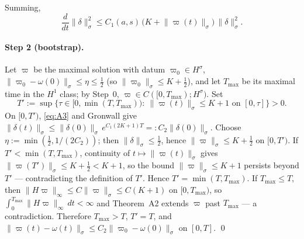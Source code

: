 \documentclass[11pt,a4paper]{article}
\theoremstyle{plain}
\theoremstyle{definition}
\theoremstyle{plain}
\newcommand{\nrm}[1]{\lVert #1 \rVert}
\begin{document}
Summing,
\begin{equation}\label{eq:A3}
\frac{d}{dt}\nrm{\delta}_\sigma^2\le C_1(a,s)\,\big(K+\nrm{\varpi(t)}_\sigma\big)\,\nrm{\delta}_\sigma^2.
\end{equation}

\paragraph{Step 2 (bootstrap).} Let $\varpi$ be the maximal solution with datum $\varpi_0\in H^\sigma$, $\nrm{\varpi_0-\omega(0)}_\sigma\le\eta\le\tfrac12$ (so $\nrm{\varpi_0}_\sigma\le K+\tfrac12$), and let $T_{\max}$ be its maximal time in the $H^1$ class; by Step~0, $\varpi\in C([0,T_{\max});H^\sigma)$. Set
\[
T':=\sup\big\{\tau\in[0,\min(T,T_{\max})):\ \nrm{\varpi(t)}_\sigma\le K+1\text{ on }[0,\tau]\big\}>0.
\]
On $[0,T')$, \eqref{eq:A3} and Gronwall give $\nrm{\delta(t)}_\sigma\le\nrm{\delta(0)}_\sigma\,e^{C_1(2K+1)T}=:C_2\nrm{\delta(0)}_\sigma$. Choose $\eta:=\min(\tfrac12,1/(2C_2))$; then $\nrm{\delta}_\sigma\le\tfrac12$, hence $\nrm{\varpi}_\sigma\le K+\tfrac12$ on $[0,T')$. If $T'<\min(T,T_{\max})$, continuity of $t\mapsto\nrm{\varpi(t)}_\sigma$ gives $\nrm{\varpi(T')}_\sigma\le K+\tfrac12<K+1$, so the bound $\nrm{\varpi}_\sigma\le K+1$ persists beyond $T'$ --- contradicting the definition of $T'$. Hence $T'=\min(T,T_{\max})$. If $T_{\max}\le T$, then $\nrm{H\varpi}_\infty\le C\nrm{\varpi}_\sigma\le C(K+1)$ on $[0,T_{\max})$, so $\int_0^{T_{\max}}\nrm{H\varpi}_\infty\,dt<\infty$ and Theorem~A2 extends $\varpi$ past $T_{\max}$ --- a contradiction. Therefore $T_{\max}>T$, $T'=T$, and $\nrm{\varpi(t)-\omega(t)}_\sigma\le C_2\nrm{\varpi_0-\omega(0)}_\sigma$ on $[0,T]$. \qed
\end{document}
